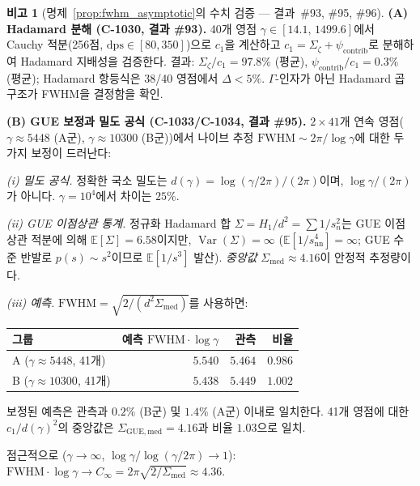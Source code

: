 \documentclass[11pt, a4paper]{article}
\theoremstyle{definition}
\newtheorem{remark}{비고}[section]
\theoremstyle{plain}
\begin{document}
\begin{remark}[명제~\ref{prop:fwhm_asymptotic}의 수치 검증 --- 결과~\#93, \#95, \#96]
\label{rem:fwhm_numerical_evidence}
\textbf{(A) Hadamard 분해 (C-1030, 결과 \#93).}
40개 영점 $\gamma \in [14.1,\, 1499.6]$에서 Cauchy 적분(256점,
$\mathrm{dps} \in [80, 350]$)으로 $c_1$을 계산하고
$c_1 = \Sigma_\zeta + \psi_{\mathrm{contrib}}$로 분해하여
Hadamard 지배성을 검증한다.
결과: $\Sigma_\zeta / c_1 = 97.8\%$ (평균),
$\psi_{\mathrm{contrib}} / c_1 = 0.3\%$ (평균);
Hadamard 항등식은 38/40 영점에서 $\Delta < 5\%$.
$\Gamma$-인자가 아닌 Hadamard 곱 구조가 FWHM을 결정함을 확인.

\smallskip\noindent
\textbf{(B) GUE 보정과 밀도 공식 (C-1033/C-1034, 결과 \#95).}
$2 \times 41$개 연속 영점($\gamma \approx 5448$ (A군),
$\gamma \approx 10300$ (B군))에서 나이브 추정
$\mathrm{FWHM} \sim 2\pi/\!\log\gamma$에 대한 두 가지 보정이 드러난다:

\smallskip\noindent
\emph{(i) 밀도 공식.}
정확한 국소 밀도는 $d(\gamma) = \log(\gamma/2\pi)/(2\pi)$이며,
$\log\gamma/(2\pi)$가 아니다.
$\gamma = 10^4$에서 차이는 $25\%$.

\smallskip\noindent
\emph{(ii) GUE 이점상관 통계.}
정규화 Hadamard 합 $\Sigma = H_1/d^2 = \sum 1/s_n^2$는
GUE 이점상관 적분에 의해 $\mathbb{E}[\Sigma] = 6.58$이지만,
$\operatorname{Var}(\Sigma) = \infty$
($\mathbb{E}[1/s_{\mathrm{nn}}^4] = \infty$; GUE 수준 반발로
$p(s) \sim s^2$이므로 $\mathbb{E}[1/s^3]$ 발산).
\emph{중앙값} $\Sigma_{\mathrm{med}} \approx 4.16$이 안정적 추정량이다.

\smallskip\noindent
\emph{(iii) 예측.}
$\mathrm{FWHM} = \sqrt{2/(d^2 \Sigma_{\mathrm{med}})}$를 사용하면:
\begin{center}
\small
\begin{tabular}{@{}lrrr@{}}
\toprule
그룹 & 예측 $\mathrm{FWHM}\!\cdot\!\log\gamma$ & 관측 & 비율 \\
\midrule
A ($\gamma \approx 5448$, 41개) & $5.540$ & $5.464$ & $0.986$ \\
B ($\gamma \approx 10300$, 41개) & $5.438$ & $5.449$ & $1.002$ \\
\bottomrule
\end{tabular}
\end{center}
보정된 예측은 관측과 $0.2\%$ (B군) 및 $1.4\%$ (A군) 이내로 일치한다.
41개 영점에 대한 $c_1/d(\gamma)^2$의 중앙값은
$\Sigma_{\mathrm{GUE,med}} = 4.16$과 비율 $1.03$으로 일치.

점근적으로 ($\gamma \to \infty$, $\log\gamma/\log(\gamma/2\pi) \to 1$):
$\mathrm{FWHM}\!\cdot\!\log\gamma \to C_\infty = 2\pi\sqrt{2/\Sigma_{\mathrm{med}}} \approx 4.36$.


\end{remark}
\end{document}
